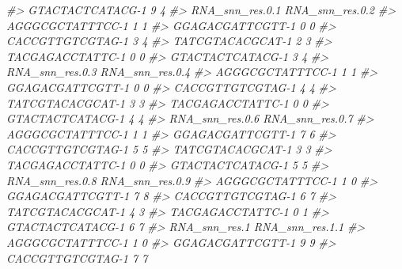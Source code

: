 \documentclass[
]{book}
\newenvironment{Shaded}{\begin{snugshade}}{\end{snugshade}}
\newcommand{\CommentTok}[1]{\textcolor[rgb]{0.56,0.35,0.01}{\textit{#1}}}
\begin{document}
\begin{Shaded}
\begin{Highlighting}[]
\CommentTok{\#\textgreater{} GTACTACTCATACG{-}1            9                4}
\CommentTok{\#\textgreater{}                  RNA\_snn\_res.0.1 RNA\_snn\_res.0.2}
\CommentTok{\#\textgreater{} AGGGCGCTATTTCC{-}1               1               1}
\CommentTok{\#\textgreater{} GGAGACGATTCGTT{-}1               0               0}
\CommentTok{\#\textgreater{} CACCGTTGTCGTAG{-}1               3               4}
\CommentTok{\#\textgreater{} TATCGTACACGCAT{-}1               2               3}
\CommentTok{\#\textgreater{} TACGAGACCTATTC{-}1               0               0}
\CommentTok{\#\textgreater{} GTACTACTCATACG{-}1               3               4}
\CommentTok{\#\textgreater{}                  RNA\_snn\_res.0.3 RNA\_snn\_res.0.4}
\CommentTok{\#\textgreater{} AGGGCGCTATTTCC{-}1               1               1}
\CommentTok{\#\textgreater{} GGAGACGATTCGTT{-}1               0               0}
\CommentTok{\#\textgreater{} CACCGTTGTCGTAG{-}1               4               4}
\CommentTok{\#\textgreater{} TATCGTACACGCAT{-}1               3               3}
\CommentTok{\#\textgreater{} TACGAGACCTATTC{-}1               0               0}
\CommentTok{\#\textgreater{} GTACTACTCATACG{-}1               4               4}
\CommentTok{\#\textgreater{}                  RNA\_snn\_res.0.6 RNA\_snn\_res.0.7}
\CommentTok{\#\textgreater{} AGGGCGCTATTTCC{-}1               1               1}
\CommentTok{\#\textgreater{} GGAGACGATTCGTT{-}1               7               6}
\CommentTok{\#\textgreater{} CACCGTTGTCGTAG{-}1               5               5}
\CommentTok{\#\textgreater{} TATCGTACACGCAT{-}1               3               3}
\CommentTok{\#\textgreater{} TACGAGACCTATTC{-}1               0               0}
\CommentTok{\#\textgreater{} GTACTACTCATACG{-}1               5               5}
\CommentTok{\#\textgreater{}                  RNA\_snn\_res.0.8 RNA\_snn\_res.0.9}
\CommentTok{\#\textgreater{} AGGGCGCTATTTCC{-}1               1               0}
\CommentTok{\#\textgreater{} GGAGACGATTCGTT{-}1               7               8}
\CommentTok{\#\textgreater{} CACCGTTGTCGTAG{-}1               6               7}
\CommentTok{\#\textgreater{} TATCGTACACGCAT{-}1               4               3}
\CommentTok{\#\textgreater{} TACGAGACCTATTC{-}1               0               1}
\CommentTok{\#\textgreater{} GTACTACTCATACG{-}1               6               7}
\CommentTok{\#\textgreater{}                  RNA\_snn\_res.1 RNA\_snn\_res.1.1}
\CommentTok{\#\textgreater{} AGGGCGCTATTTCC{-}1             1               0}
\CommentTok{\#\textgreater{} GGAGACGATTCGTT{-}1             9               9}
\CommentTok{\#\textgreater{} CACCGTTGTCGTAG{-}1             7               7}

\end{Highlighting}
\end{Shaded}
\end{document}
